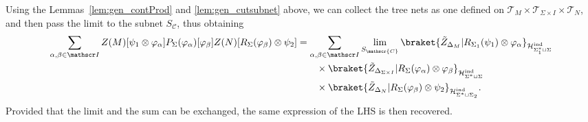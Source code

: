 \documentclass[11pt]{article}
\newcommand{\h}{\mathcal{H}}
\theoremstyle{definition}
\numberwithin{equation}{section}
\begin{document}
Using the Lemmas~\ref{lem:gen_contProd} and \ref{lem:gen_cutsubnet} above, we can collect the tree nets as one defined on $\mathcal{T}_M\times \mathcal{T}_{\Sigma\times I}\times \mathcal{T}_{N}$, and then pass the limit to the subnet $S_\mathscr{C}$, thus obtaining 
\begin{equation}
\begin{split}
    \sum_{\alpha,\beta\in\mathscr I}Z(M)[\psi_1\otimes \varphi_\alpha]P_{\Sigma}(\varphi_\alpha)[\varphi_\beta]Z(N)[R_\Sigma(\varphi_\beta)\otimes\psi_2]&=\sum_{\alpha,\beta\in\mathscr I}\lim_{S_\mathscr{C}}\braket{\tilde{Z}_{\Delta_M}|R_{\Sigma_1}(\psi_1)\otimes \varphi_\alpha}_{\h^{\rm ind}_{\Sigma^*_1\sqcup\Sigma}}\\
    &\quad\quad\times\braket{\tilde{Z}_{\Delta_{\Sigma\times I}}|R_{\Sigma}(\varphi_{\alpha})\otimes\varphi_{\beta}}_{\h^{\rm ind}_{\Sigma^*\sqcup\Sigma}}\\
    &\quad\quad\times\braket{\tilde{Z}_{\Delta_N}|R_\Sigma(\varphi_\beta)\otimes\psi_2}_{\h^{\rm ind}_{\Sigma^*\sqcup\Sigma_2}}.
\end{split}
\end{equation}
Provided that the limit and the sum can be exchanged, the same expression of the LHS is then recovered.



\end{document}
